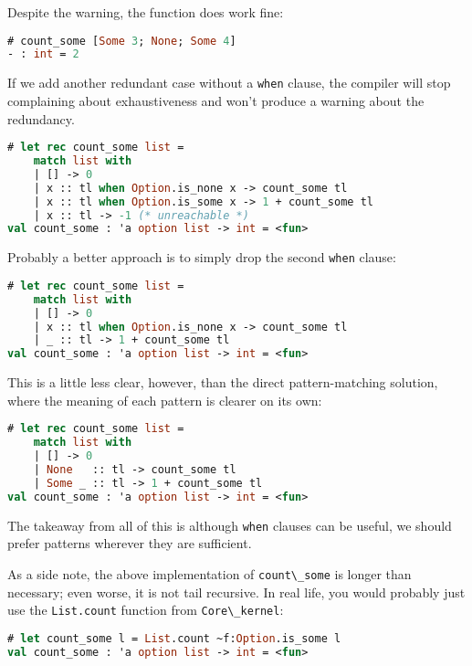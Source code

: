 Despite the warning, the function does work fine:

\begin{lstlisting}[language=Caml]
# count_some [Some 3; None; Some 4]
- : int = 2
\end{lstlisting}

If we add another redundant case without a
\passthrough{\lstinline!when!} clause, the compiler will stop
complaining about exhaustiveness and won't produce a warning about the
redundancy.

\begin{lstlisting}[language=Caml]
# let rec count_some list =
    match list with
    | [] -> 0
    | x :: tl when Option.is_none x -> count_some tl
    | x :: tl when Option.is_some x -> 1 + count_some tl
    | x :: tl -> -1 (* unreachable *)
val count_some : 'a option list -> int = <fun>
\end{lstlisting}

Probably a better approach is to simply drop the second
\passthrough{\lstinline!when!} clause:

\begin{lstlisting}[language=Caml]
# let rec count_some list =
    match list with
    | [] -> 0
    | x :: tl when Option.is_none x -> count_some tl
    | _ :: tl -> 1 + count_some tl
val count_some : 'a option list -> int = <fun>
\end{lstlisting}

This is a little less clear, however, than the direct pattern-matching
solution, where the meaning of each pattern is clearer on its own:

\begin{lstlisting}[language=Caml]
# let rec count_some list =
    match list with
    | [] -> 0
    | None   :: tl -> count_some tl
    | Some _ :: tl -> 1 + count_some tl
val count_some : 'a option list -> int = <fun>
\end{lstlisting}

The takeaway from all of this is although \passthrough{\lstinline!when!}
clauses can be useful, we should prefer patterns wherever they are
sufficient.

As a side note, the above implementation of
\passthrough{\lstinline!count\_some!} is longer than necessary; even
worse, it is not tail recursive. In real life, you would probably just
use the \passthrough{\lstinline!List.count!} function from
\passthrough{\lstinline!Core\_kernel!}:

\begin{lstlisting}[language=Caml]
# let count_some l = List.count ~f:Option.is_some l
val count_some : 'a option list -> int = <fun>
\end{lstlisting}

